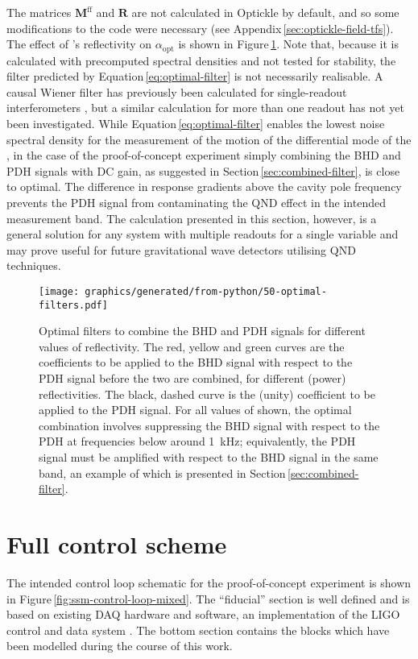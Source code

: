 The matrices $\mathbf{M}^{\textrm{ff}}$ and $\mathbf{R}$ are not calculated in Optickle by default, and so some modifications to the code were necessary (see Appendix\,\ref{sec:optickle-field-tfs}). The effect of \MINT{}'s reflectivity on $\alpha_{\textrm{opt}}$ is shown in Figure\,\ref{fig:optimal-filters}. Note that, because it is calculated with precomputed spectral densities and not tested for stability, the filter predicted by Equation\,\ref{eq:optimal-filter} is not necessarily realisable. A causal Wiener filter has previously been calculated for single-readout interferometers \cite{MuellerEbhardt2009, Miao2010}, but a similar calculation for more than one readout has not yet been investigated. While Equation\,\ref{eq:optimal-filter} enables the lowest noise spectral density for the measurement of the motion of the differential mode of the \SSM{}, in the case of the proof-of-concept experiment simply combining the \gls{BHD} and \gls{PDH} signals with \gls{DC} gain, as suggested in Section\,\ref{sec:combined-filter}, is close to optimal. The difference in response gradients above the cavity pole frequency prevents the \gls{PDH} signal from contaminating the \gls{QND} effect in the intended measurement band. The calculation presented in this section, however, is a general solution for any system with multiple readouts for a single variable and may prove useful for future gravitational wave detectors utilising \gls{QND} techniques.
\begin{figure}
  \texttt{[image: graphics/generated/from-python/50-optimal-filters.pdf]}
  \caption{\label{fig:optimal-filters}Optimal filters to combine the BHD and PDH signals for different values of \MINT{} reflectivity. The red, yellow and green curves are the coefficients to be applied to the BHD signal with respect to the PDH signal before the two are combined, for different \MINT{} (power) reflectivities. The black, dashed curve is the (unity) coefficient to be applied to the PDH signal. For all values of \MINT{} shown, the optimal combination involves suppressing the BHD signal with respect to the PDH at frequencies below around \SI{1}{\kilo\hertz}; equivalently, the PDH signal must be amplified with respect to the BHD signal in the same band, an example of which is presented in Section\,\ref{sec:combined-filter}.}
\end{figure}

\section{\label{ssm-control-scheme}Full control scheme}
The intended control loop schematic for the proof-of-concept experiment is shown in Figure\,\ref{fig:ssm-control-loop-mixed}. The ``fiducial'' section is well defined and is based on existing DAQ hardware and software, an implementation of the LIGO control and data system \cite{Bork2010}. The bottom section contains the blocks which have been modelled during the course of this work.

